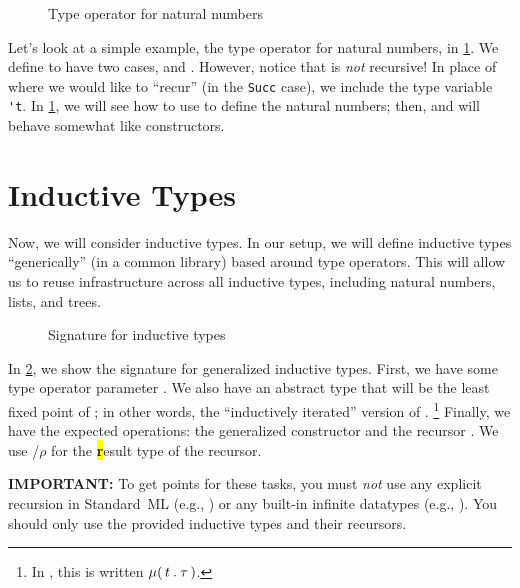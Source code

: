 \documentclass[11pt]{article}
\begin{document}
\begin{figure}[h]
  \caption{Type operator for natural numbers}
  \label{fig:nat-op}
\end{figure}

Let's look at a simple example, the type operator for natural numbers, in \cref{fig:nat-op}.
We define  to have two cases,  and .
However, notice that  is \emph{not} recursive!
In place of where we would like to ``recur'' (in the \lstinline{Succ} case), we include the type variable \lstinline{'t}.
In \cref{sec:inductive}, we will see how to use  to define the natural numbers; then,  and  will behave somewhat like constructors.


\section{Inductive Types}\label{sec:inductive}

Now, we will consider inductive types.
In our setup, we will define inductive types ``generically'' (in a common library) based around type operators.
This will allow us to reuse infrastructure across all inductive types, including natural numbers, lists, and trees.

\begin{figure}[h]
  \caption{Signature for inductive types}
  \label{fig:inductive}
\end{figure}

In \cref{fig:inductive}, we show the signature for generalized inductive types.
First, we have some type operator parameter .
We also have an abstract type  that will be the least fixed point of ; in other words, the ``inductively iterated'' version of .%
\footnote{In \PFPL[15], this is written ${\mu}\mathtt{(}\,{t}\mathbin{\mathtt{.}}{\tau}\,\mathtt{)}$.}
Finally, we have the expected operations: the generalized constructor  and the recursor .
We use /$\rho$ for the \colorbox{yellow}{\textbf{r}}esult type of the recursor.

{\color{red}\textbf{IMPORTANT:}}
To get points for these tasks, you must \emph{not} use any explicit recursion in Standard~ML (e.g., ) or any built-in infinite datatypes (e.g., ).
You should only use the provided inductive types and their recursors.
\end{document}
